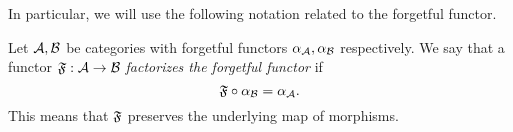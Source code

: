 In particular, we will use the following notation related to the forgetful functor.

\begin{notation}{}{}
Let $\mathcal{A}, \mathcal{B}$ be categories with forgetful functors $\alpha_{\mathcal{A}}, \alpha_{\mathcal{B}}$ respectively. We say that a functor $\mathfrak{F}: \mathcal{A} \to \mathcal{B}$ \emph{factorizes the forgetful functor} if
\begin{equation*}
    \mathfrak{F} \circ \alpha_{\mathcal{B}} = \alpha_{\mathcal{A}}.
\end{equation*}
This means that $\mathfrak{F}$ preserves the underlying map of morphisms.
\end{notation}
